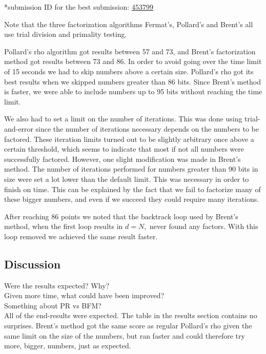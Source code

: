 \documentclass[paper=a4, fontsize=11pt,numbers=endperiod]{scrartcl} %
\numberwithin{equation}{section} %
\numberwithin{figure}{section} %
\numberwithin{table}{section} %
\begin{document}
    \footnotesize{*submission ID for the best submission: \href{https://kth.kattis.scrool.se/submission?id=454917}{453799}
    \normalsize

Note that the three factorization algorithms Fermat's, Pollard's and Brent's all use trial division and primality testing.

Pollard's rho algorithm got results between 57 and 73, and Brent's factorization method got results between 73 and 86.
In order to avoid going over the time limit of 15 seconds we had to skip numbers above a certain size.
Pollard's rho got its best results when we skipped numbers greater than 86 bits.
Since Brent's method is faster, we were able to include numbers up to 95 bits without reaching the time limit.

We also had to set a limit on the number of iterations.
This was done using trial-and-error since the number of iterations necessary depends on the numbers to be factored.
These iteration limits turned out to be slightly arbitrary once above a certain threshold, which seems to indicate that most if not all numbers were successfully factored.
However, one slight modification was made in Brent's method.
The number of iterations performed for numbers greater than 90 bits in size were set a lot lower than the default limit. This was necessary in order to finish on time. 
This can be explained by the fact that we fail to factorize many of these bigger numbers, 
and even if we succeed they could require many iterations.

After reaching 86 points we noted that the backtrack loop used by Brent's method, when the first loop results in $d = N,$ never found any factors. With this loop removed we achieved the same result faster.



\subsection{Discussion}
Were the results expected? Why?\\
Given more time, what could have been improved?\\
Something about PR vs BFM?\\

All of the end-results were expected.
The table in the results section contains no surprises.
Brent's method got the same score as regular Pollard's rho given the same limit on the size of the numbers, but ran faster and could therefore try more, bigger, numbers, just as expected.


}
\end{document}
